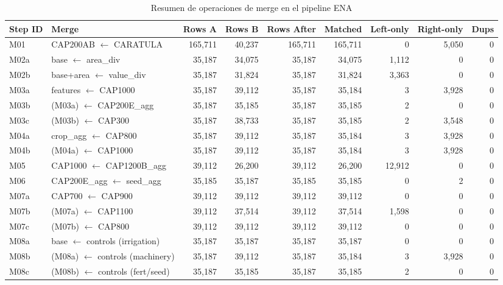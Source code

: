 \documentclass[11pt,a4paper]{article}
\begin{document}
\begin{landscape}
\begin{table}[H]
\centering
\caption{Resumen de operaciones de merge en el pipeline ENA}
\label{tab:merge_summary}
\begin{threeparttable}
\footnotesize
\begin{tabular}{llrrrrrrr}
\toprule
\textbf{Step ID} & \textbf{Merge} & \textbf{Rows A} & \textbf{Rows B} & \textbf{Rows After} & \textbf{Matched} & \textbf{Left-only} & \textbf{Right-only} & \textbf{Dups} \\
\midrule
M01 & CAP200AB $\leftarrow$ CARATULA & 165,711 & 40,237 & 165,711 & 165,711 & 0 & 5,050 & 0 \\
M02a & base $\leftarrow$ area\_div & 35,187 & 34,075 & 35,187 & 34,075 & 1,112 & 0 & 0 \\
M02b & base+area $\leftarrow$ value\_div & 35,187 & 31,824 & 35,187 & 31,824 & 3,363 & 0 & 0 \\
M03a & features $\leftarrow$ CAP1000 & 35,187 & 39,112 & 35,187 & 35,184 & 3 & 3,928 & 0 \\
M03b & (M03a) $\leftarrow$ CAP200E\_agg & 35,187 & 35,185 & 35,187 & 35,185 & 2 & 0 & 0 \\
M03c & (M03b) $\leftarrow$ CAP300 & 35,187 & 38,733 & 35,187 & 35,185 & 2 & 3,548 & 0 \\
M04a & crop\_agg $\leftarrow$ CAP800 & 35,187 & 39,112 & 35,187 & 35,184 & 3 & 3,928 & 0 \\
M04b & (M04a) $\leftarrow$ CAP1000 & 35,187 & 39,112 & 35,187 & 35,184 & 3 & 3,928 & 0 \\
M05 & CAP1000 $\leftarrow$ CAP1200B\_agg & 39,112 & 26,200 & 39,112 & 26,200 & 12,912 & 0 & 0 \\
M06 & CAP200E\_agg $\leftarrow$ seed\_agg & 35,185 & 35,187 & 35,185 & 35,185 & 0 & 2 & 0 \\
M07a & CAP700 $\leftarrow$ CAP900 & 39,112 & 39,112 & 39,112 & 39,112 & 0 & 0 & 0 \\
M07b & (M07a) $\leftarrow$ CAP1100 & 39,112 & 37,514 & 39,112 & 37,514 & 1,598 & 0 & 0 \\
M07c & (M07b) $\leftarrow$ CAP800 & 39,112 & 39,112 & 39,112 & 39,112 & 0 & 0 & 0 \\
M08a & base $\leftarrow$ controls (irrigation) & 35,187 & 35,187 & 35,187 & 35,187 & 0 & 0 & 0 \\
M08b & (M08a) $\leftarrow$ controls (machinery) & 35,187 & 39,112 & 35,187 & 35,184 & 3 & 3,928 & 0 \\
M08c & (M08b) $\leftarrow$ controls (fert/seed) & 35,187 & 35,185 & 35,187 & 35,185 & 2 & 0 & 0 \\

\end{tabular}
\end{threeparttable}
\end{table}
\end{landscape}
\end{document}
